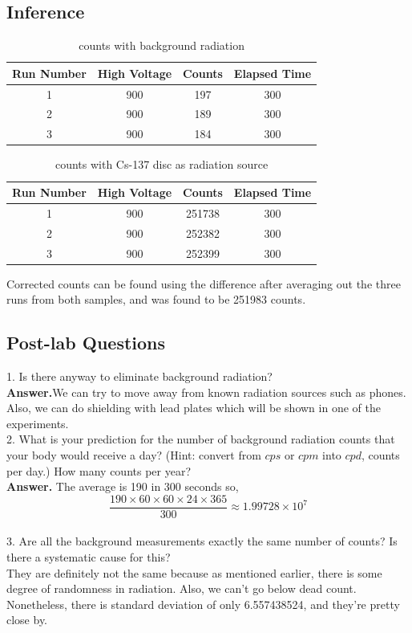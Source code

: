 \documentclass[twocolumn]{article}
\begin{document}
 \subsection*{Inference}
 \begin{table}[h!]
  \centering
  \caption{counts with background radiation}
  \begin{tabular}{|c|c|c|c|}
    \hline
    \textbf{Run Number} & \textbf{High Voltage} & \textbf{Counts} & \textbf{Elapsed Time} \\
    \hline
    1 & 900 & 197 & 300 \\
    \hline
    2 & 900 & 189 & 300 \\
    \hline
    3 & 900 & 184 & 300 \\
    \hline
  \end{tabular}
  
  
\end{table}
 \begin{table}[h!]
  \centering
  \caption{counts with Cs-137 disc as radiation source}
  \begin{tabular}{|c|c|c|c|}
    \hline
    \textbf{Run Number} & \textbf{High Voltage} & \textbf{Counts} & \textbf{Elapsed Time} \\
    \hline
    1 & 900 & 251738 & 300 \\
    \hline
    2 & 900 & 252382 & 300 \\
    \hline
    3 & 900 & 252399 & 300 \\
    \hline
  \end{tabular}
\end{table}
Corrected counts can be found using the difference after averaging out the three runs from both samples, and was found to be 251983 counts.
\subsection*{Post-lab Questions}
1. Is there anyway to eliminate background radiation?\\
\textbf{Answer.}We can try to move away from known radiation sources such as phones. Also, we can do shielding with lead plates which will be shown in one of the experiments.\\
2. What is your prediction for the number of background radiation counts that your body would receive a day? (Hint: convert from $cps$ or $cpm$ into $cpd$,
counts per day.) How many counts per year?\\
\textbf{Answer.} The average is 190 in 300 seconds so, \begin{equation*}
\frac{190\times60\times60\times24\times365}{300}\approx 1.99728\times 10^7
\end{equation*}
\\
3. Are all the background measurements exactly the same number of counts?
Is there a systematic cause for this?\\
They are definitely not the same because as mentioned earlier, there is some degree of randomness in radiation. Also, we can't go below dead count. Nonetheless, there is standard deviation of only 6.557438524, and they're pretty close by.
\\
\end{document}
